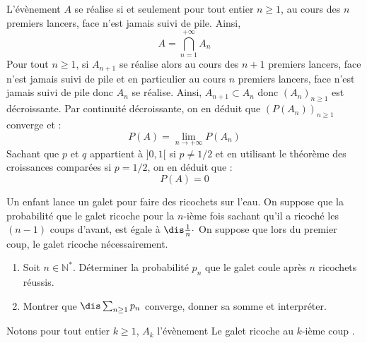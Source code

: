 \documentclass[a4paper,10pt]{report}
\begin{document}
\begin{enumerate}
\medskip

\noindent L'évènement $A$ se réalise si et seulement pour tout entier $n \geq 1$, au cours des $n$ premiers lancers, face n'est jamais suivi de pile. Ainsi,
$$ A = \bigcap_{n=1}^{+ \infty} A_n$$
Pour tout $n \geq 1$, si $A_{n+1}$ se réalise alors au cours des $n+1$ premiers lancers, face n'est jamais suivi de pile et en particulier au cours $n$ premiers lancers, face n'est jamais suivi de pile donc $A_n$ se réalise. Ainsi, $A_{n+1} \subset A_n$ donc $(A_n)_{n \geq 1}$ est décroissante. Par continuité décroissante, on en déduit que $(P(A_n))_{n \geq 1}$ converge et :
$$ P(A) = \lim_{n \rightarrow + \infty} P(A_n)$$
Sachant que $p$ et $q$ appartient à $]0,1[$ si $p \neq 1/2$ et en utilisant le théorème des croissances comparées si $p=1/2$, on en déduit que :
$$ P(A)=0$$
\end{enumerate}

\begin{Exercice}{} Un enfant lance un galet pour faire des ricochets sur l'eau. On suppose que la probabilité que le galet ricoche pour la $n$-ième fois sachant qu'il a ricoché les $(n-1)$ coups d'avant, est égale à $\dis \frac{1}{n}\cdot$ On suppose que lors du premier coup, le galet ricoche nécessairement.
\begin{enumerate}
\item Soit $n \in \mathbb{N}^*$. Déterminer la probabilité $p_n$ que le galet coule après $n$ ricochets réussis.
\item Montrer que $\dis \sum_{n \geq 1} p_n$ converge, donner sa somme et interpréter.
\end{enumerate}
\end{Exercice}

\corr Notons pour tout entier $k \geq 1$, $A_k$ l'évènement \og Le galet ricoche au $k$-ième coup \fg.
\end{document}
